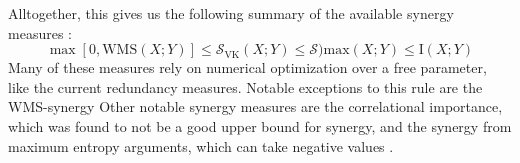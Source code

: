\documentclass[../main.tex]{subfiles}
\begin{document}
Alltogether, this gives us the following summary of the available synergy measures \cite{griffith2014quantifying}:
%
\begin{equation}
\max [0,\mathrm{WMS}(X;Y)] \le \mathcal{S}_\mathrm{VK} (X;Y) \le \mathcal{S})\mathrm{max} (X;Y) \le \mathrm{I}(X;Y)
\end{equation}
%
Many of these measures rely on numerical optimization over a free parameter, like the current redundancy measures.
Notable exceptions to this rule are the WMS-synergy
Other notable synergy measures are the correlational importance, which was found to not be a good upper bound for synergy, and the synergy from maximum entropy arguments, which can take negative values \cite{griffith2014quantifying, olbrich2015information}.
\end{document}
